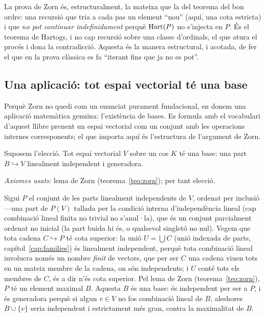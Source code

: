 \begin{observacio}\label{obs:zorn-hartogs}
La prova de Zorn és, estructuralment, la mateixa que la del teorema del bon
ordre: una recursió que tria a cada pas un element \enquote{nou} (aquí, una
cota estricta) i que \emph{no pot continuar indefinidament} perquè
\(\operatorname{Hart}(P)\) no s'injecta en \(P\). És el teorema de Hartogs, i no cap
recursió sobre una classe d'ordinals, el que atura el procés i dona la
contradicció. Aquesta és la manera estructural, i acotada, de fer el que en
la prova clàssica es fa \enquote{iterant fins que ja no es pot}.
\end{observacio}

\subsection{Una aplicació: tot espai vectorial té una base}\label{sub:base}

Perquè Zorn no quedi com un enunciat purament fundacional, en donem una
aplicació matemàtica genuïna: l'existència de bases. Es formula amb el
vocabulari d'aquest llibre prenent un espai vectorial com un conjunt amb les
operacions internes corresponents; el que importa aquí és l'estructura de
l'argument de Zorn.

\begin{proposicio}\label{prop:base}
Suposem l'elecció. Tot espai vectorial \(V\) sobre un cos \(K\) té una base:
una part \(B\hookrightarrow V\) linealment independent i generadora.\par
\emph{Axiomes usats:} lema de Zorn (teorema~\ref{teo:zorn}); per tant elecció.
\end{proposicio}

\begin{prova}
Sigui \(P\) el conjunt de les parts linealment independents de \(V\),
ordenat per inclusió ---una part de \(P(V)\) tallada per la condició interna
d'independència lineal (cap combinació lineal finita no trivial no s'anul·la),
que és un conjunt parcialment ordenat no inicial (la part buida hi és, o
qualsevol singletó no nul). Vegem que tota cadena \(C\hookrightarrow P\) té
cota superior: la unió \(U=\bigcup C\) (unió indexada de parts,
capítol~\ref{cap:families}) és linealment independent, perquè tota
combinació lineal involucra només un nombre \emph{finit} de vectors, que per
ser \(C\) una cadena viuen tots en un mateix membre de la cadena, on són
independents; i \(U\) conté tots els membres de \(C\), és a dir n'és cota
superior. Pel lema de Zorn (teorema~\ref{teo:zorn}), \(P\) té un element
maximal \(B\). Aquesta \(B\) és una base: és independent per ser a \(P\), i
és generadora perquè si algun \(v\in V\) no fos combinació lineal de \(B\),
aleshores \(B\cup\{v\}\) seria independent i estrictament més gran, contra la
maximalitat de \(B\).
\end{prova}

